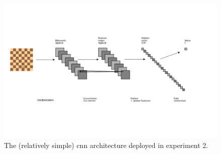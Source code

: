 \begin{figure}
\centering
\includegraphics[trim={0 6cm 0 6cm},clip,scale=0.5]{fig/arch/cnn1}
\caption[\gls{cnn} architecture deployed in experiment 2]{The (relatively simple) \gls{cnn} architecture deployed in experiment 2.}
\label{fig:cnn1}
\end{figure}

